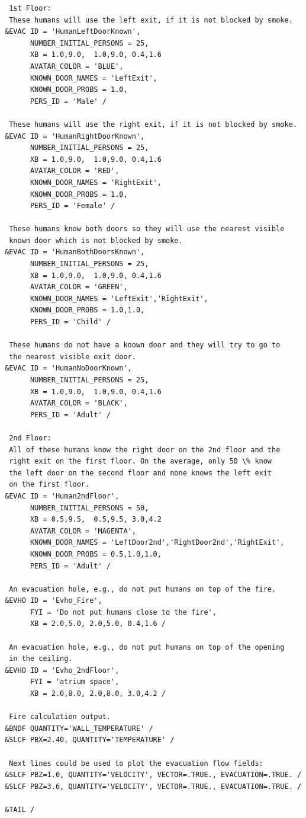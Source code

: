 \documentclass[12pt,a4paper,final,twoside]{stylevk}
\begin{document}
{\begin{verbatim}
 1st Floor:
 These humans will use the left exit, if it is not blocked by smoke.
&EVAC ID = 'HumanLeftDoorKnown', 
      NUMBER_INITIAL_PERSONS = 25,
      XB = 1.0,9.0,  1.0,9.0, 0.4,1.6
      AVATAR_COLOR = 'BLUE',
      KNOWN_DOOR_NAMES = 'LeftExit',
      KNOWN_DOOR_PROBS = 1.0,
      PERS_ID = 'Male' / 

 These humans will use the right exit, if it is not blocked by smoke.
&EVAC ID = 'HumanRightDoorKnown', 
      NUMBER_INITIAL_PERSONS = 25,
      XB = 1.0,9.0,  1.0,9.0, 0.4,1.6
      AVATAR_COLOR = 'RED',
      KNOWN_DOOR_NAMES = 'RightExit',
      KNOWN_DOOR_PROBS = 1.0,
      PERS_ID = 'Female' / 

 These humans know both doors so they will use the nearest visible
 known door which is not blocked by smoke.
&EVAC ID = 'HumanBothDoorsKnown', 
      NUMBER_INITIAL_PERSONS = 25,
      XB = 1.0,9.0,  1.0,9.0, 0.4,1.6
      AVATAR_COLOR = 'GREEN',
      KNOWN_DOOR_NAMES = 'LeftExit','RightExit',
      KNOWN_DOOR_PROBS = 1.0,1.0,
      PERS_ID = 'Child' / 

 These humans do not have a known door and they will try to go to
 the nearest visible exit door. 
&EVAC ID = 'HumanNoDoorKnown', 
      NUMBER_INITIAL_PERSONS = 25,
      XB = 1.0,9.0,  1.0,9.0, 0.4,1.6
      AVATAR_COLOR = 'BLACK',
      PERS_ID = 'Adult' / 

 2nd Floor:
 All of these humans know the right door on the 2nd floor and the
 right exit on the first floor. On the average, only 50 \% know
 the left door on the second floor and none knows the left exit
 on the first floor.
&EVAC ID = 'Human2ndFloor', 
      NUMBER_INITIAL_PERSONS = 50,
      XB = 0.5,9.5,  0.5,9.5, 3.0,4.2
      AVATAR_COLOR = 'MAGENTA',
      KNOWN_DOOR_NAMES = 'LeftDoor2nd','RightDoor2nd','RightExit',
      KNOWN_DOOR_PROBS = 0.5,1.0,1.0,
      PERS_ID = 'Adult' / 

 An evacuation hole, e.g., do not put humans on top of the fire.
&EVHO ID = 'Evho_Fire',
      FYI = 'Do not put humans close to the fire',
      XB = 2.0,5.0, 2.0,5.0, 0.4,1.6 /

 An evacuation hole, e.g., do not put humans on top of the opening
 in the ceiling.
&EVHO ID = 'Evho_2ndFloor',
      FYI = 'atrium space',
      XB = 2.0,8.0, 2.0,8.0, 3.0,4.2 /

 Fire calculation output.
&BNDF QUANTITY='WALL_TEMPERATURE' / 
&SLCF PBX=2.40, QUANTITY='TEMPERATURE' /

 Next lines could be used to plot the evacuation flow fields:
&SLCF PBZ=1.0, QUANTITY='VELOCITY', VECTOR=.TRUE., EVACUATION=.TRUE. / 
&SLCF PBZ=3.6, QUANTITY='VELOCITY', VECTOR=.TRUE., EVACUATION=.TRUE. / 

&TAIL /
\end{verbatim}
}
\end{document}
